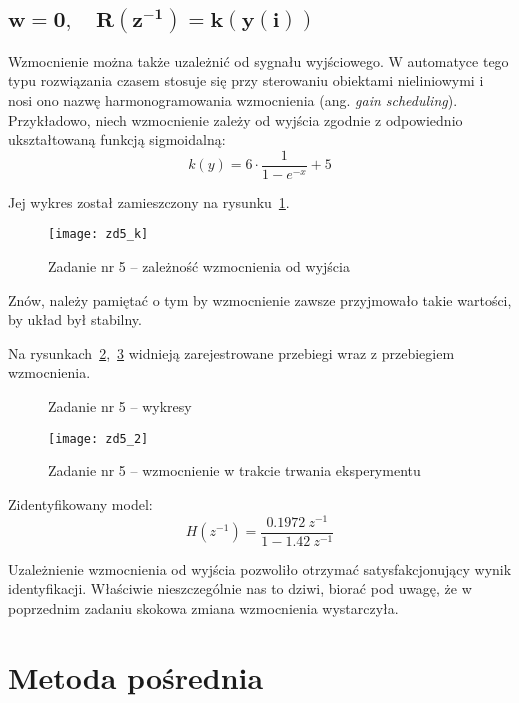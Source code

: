 \documentclass[11pt, a4paper]{article}
\begin{document}
\subsection{$\displaystyle \mathbf{w = 0, \quad R(z^{-1}) = k(y(i))}$}

Wzmocnienie można także uzależnić od sygnału wyjściowego. W automatyce tego typu rozwiązania czasem stosuje się przy sterowaniu obiektami nieliniowymi i nosi ono nazwę harmonogramowania wzmocnienia (ang. \emph{gain scheduling}). Przykładowo, niech wzmocnienie zależy od wyjścia zgodnie z odpowiednio ukształtowaną funkcją sigmoidalną:
\[
	k(y) = 6 \cdot \frac{1}{1 - e^{-x}} + 5
\]

Jej wykres został zamieszczony na rysunku~\ref{fig:sig}.
\begin{figure}[htbp!]
	\centering
	\texttt{[image: zd5\_k]}%
	\caption{Zadanie nr 5 -- zależność wzmocnienia od wyjścia}
	\label{fig:sig}
\end{figure}

Znów, należy pamiętać o tym by wzmocnienie zawsze przyjmowało takie wartości, by układ był stabilny.

Na rysunkach~\ref{fig:zd5},~\ref{fig:zd5_2} widnieją zarejestrowane przebiegi wraz z przebiegiem wzmocnienia.
\begin{figure}[htbp!]
	\centering
	\hfill%
	\caption{Zadanie nr 5 -- wykresy}
	\label{fig:zd5}
\end{figure}

\begin{figure}[htbp!]
	\centering
	\texttt{[image: zd5\_2]}%
	\caption{Zadanie nr 5 -- wzmocnienie w trakcie trwania eksperymentu}
	\label{fig:zd5_2}
\end{figure}

Zidentyfikowany model:
\[
	H(z^{-1}) = \frac{0.1972 \ z^{-1}}{1 - 1.42 \ z^{-1}}
\]

Uzależnienie wzmocnienia od wyjścia pozwoliło otrzymać satysfakcjonujący wynik identyfikacji. Właściwie nieszczególnie nas to dziwi, biorać pod uwagę, że w poprzednim zadaniu skokowa zmiana wzmocnienia wystarczyła.

\clearpage
\newpage

\section{Metoda pośrednia}
\end{document}
